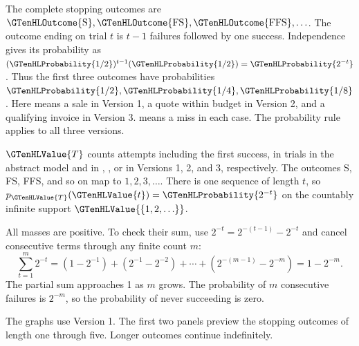 
The complete stopping outcomes are $\GTenHLOutcome{\mathrm{S}},\GTenHLOutcome{\mathrm{FS}},\GTenHLOutcome{\mathrm{FFS}},\ldots$. The outcome ending on trial $t$ is $t-1$ failures followed by one success. Independence gives its probability as $(\GTenHLProbability{1/2})^{t-1}(\GTenHLProbability{1/2})=\GTenHLProbability{2^{-t}}$. Thus the first three outcomes have probabilities $\GTenHLProbability{1/2},\GTenHLProbability{1/4},\GTenHLProbability{1/8}$. Here  means a sale in Version 1, a quote within budget in Version 2, and a qualifying invoice in Version 3.  means a miss in each case. The probability rule applies to all three versions.

$\GTenHLValue{T}$ counts attempts including the first success, in trials in the abstract model and in , , or  in Versions 1, 2, and 3, respectively. The outcomes S, FS, FFS, and so on map to $1,2,3,\ldots$. There is one sequence of length $t$, so $p_{\GTenHLValue{T}}(\GTenHLValue{t})=\GTenHLProbability{2^{-t}}$ on the countably infinite support $\GTenHLValue{\{1,2,\ldots\}}$.

All masses are positive. To check their sum, use $2^{-t}=2^{-(t-1)}-2^{-t}$ and cancel consecutive terms through any finite count $m$:
\[
\sum_{t=1}^{m}2^{-t}=(1-2^{-1})+(2^{-1}-2^{-2})+\cdots+(2^{-(m-1)}-2^{-m})=1-2^{-m}.
\]
The partial sum approaches 1 as $m$ grows. The probability of $m$ consecutive failures is $2^{-m}$, so the probability of never succeeding is zero.

The graphs use Version 1. The first two panels preview the stopping outcomes of length one through five. Longer outcomes continue indefinitely.

